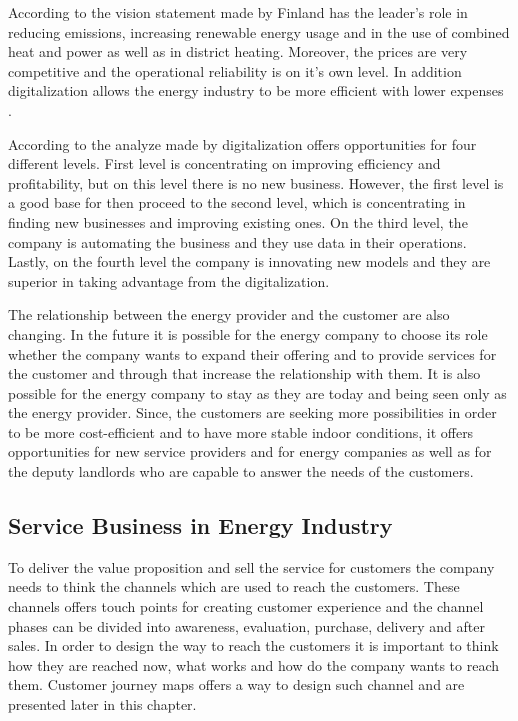 According to the vision statement made by \textcite{Energiateollisuus:2018} Finland has the leader's role in reducing emissions, increasing renewable energy usage and in the use of combined heat and power as well as in district heating. Moreover, the prices are very competitive and the operational reliability is on it's own level. In addition digitalization allows the energy industry to be more efficient with lower expenses \parencite{Tekes:2017}.

According to the analyze made by \textcite{Deloitte} digitalization offers opportunities for four different levels. First level is concentrating on improving efficiency and profitability, but on this level there is no new business. However, the first level is a good base for then proceed to the second level, which is concentrating in finding new businesses and improving existing ones. On the third level, the company is automating the business and they use data in their operations. Lastly, on the fourth level the company is innovating new models and they are superior in taking advantage from the digitalization.

The relationship between the energy provider and the customer are also changing. In the future it is possible for the energy company to choose its role whether the company wants to expand their offering and to provide services for the customer and through that increase the relationship with them. It is also possible for the energy company to stay as they are today and being seen only as the energy provider. Since, the customers are seeking more possibilities in order to be more cost-efficient and to have more stable indoor conditions, it offers opportunities for new service providers and for energy companies as well as for the deputy landlords who are capable to answer the needs of the customers. \parencite{Deloitte}

\subsection{Service Business in Energy Industry}

To deliver the value proposition and sell the service for customers the company needs to think the channels which are used to reach the customers. These channels offers touch points for creating customer experience and the channel phases can be divided into awareness, evaluation, purchase, delivery and after sales. In order to design the way to reach the customers it is important to think how they are reached now, what works and how do the company wants to reach them. \parencite{BusinessModelGeneration:2010} Customer journey maps offers a way to design such channel and are presented later in this chapter.

